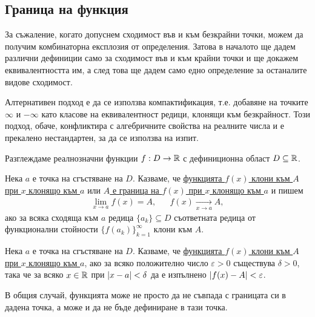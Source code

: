 \documentclass[numbers=endperiod, DIV=15, bibliography=totocnumbered]{scrartcl}
\begin{document}
\subsection{Граница на функция}

\begin{note}
  За съжаление, когато допуснем сходимост във и към безкрайни точки, можем да получим комбинаторна експлозия от определения. Затова в началото ще дадем различни дефиниции само за сходимост във и към крайни точки и ще докажем еквивалентността им, а след това ще дадем само едно определение за останалите видове сходимост.

  Алтернативен подход е да се използва компактификация, т.е. добавяне на точките $\infty$ и $-\infty$ като класове на еквивалентност редици, клонящи към безкрайност. Този подход, обаче, конфликтира с алгебричните свойства на реалните числа и е прекалено нестандартен, за да се използва на изпит.
\end{note}

Разглеждаме реалнозначни функции $f: D \to \mathbb{R}$ с дефиниционна област $D \subseteq \mathbb{R}$.

\begin{definition}
  Нека $a$ е точка на сгъстяване на $D$. Казваме, че \uline{функцията $f(x)$ клони към $A$ при $x$ клонящо към $a$} или \uline{$A$ е граница на $f(x)$ при $x$ клонящо към $a$} и пишем
  \begin{align*}
    \lim_{x \to a} f(x) = A,
    &&
    f(x) \underset {x \to a} \longrightarrow A,
  \end{align*}
  ако за всяка сходяща към $a$ редица $\{ a_k \} \subseteq D$ съответната редица от функционални стойности ${\{ f(a_k) \}}_{k=1}^\infty$ клони към $A$.
\end{definition}

\begin{definition}
  Нека $a$ е точка на сгъстяване на $D$. Казваме, че \uline{функцията $f(x)$ клони към $A$ при $x$ клонящо към $a$}, ако за всяко положително число $\varepsilon > 0$ съществува $\delta > 0$, така че за всяко $x \in \mathbb{R}$ при $\left\vert x - a \right\vert < \delta$ да е изпълнено $\left\vert f(x) - A \right\vert < \varepsilon$.
\end{definition}

\begin{note}
  В общия случай, функцията може не просто да не съвпада с границата си в дадена точка, а може и да не бъде дефиниране в тази точка.
\end{note}
\end{document}
